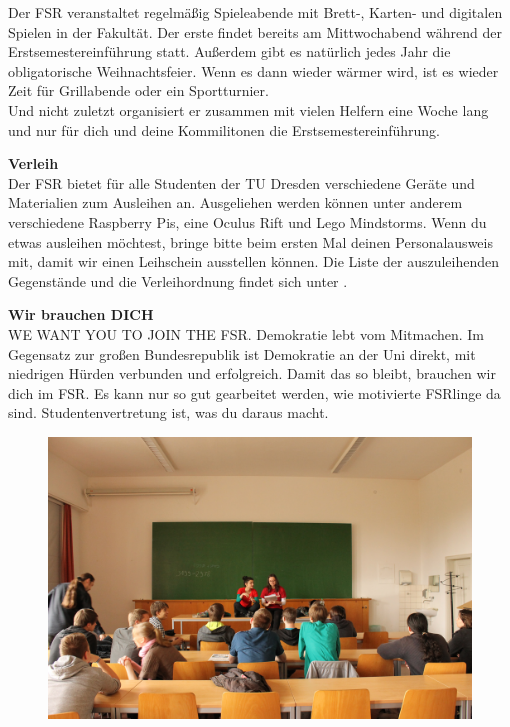 Der FSR veranstaltet regelmäßig Spieleabende mit Brett-, Karten- und digitalen Spielen in der Fakultät. Der erste findet bereits am Mittwochabend während der Erstsemestereinführung statt.
Außerdem gibt es natürlich jedes Jahr die obligatorische Weihnachtsfeier.
Wenn es dann wieder wärmer wird, ist es wieder Zeit für Grillabende oder ein Sportturnier. \\

Und nicht zuletzt organisiert er zusammen mit vielen Helfern eine Woche lang und nur für dich und deine Kommilitonen die Erstsemestereinführung.

\textbf{Verleih} \\
Der FSR bietet für alle Studenten der TU Dresden verschiedene Geräte und Materialien zum Ausleihen an. Ausgeliehen werden können unter anderem verschiedene Raspberry Pis, eine Oculus Rift und Lego Mindstorms.
Wenn du etwas ausleihen möchtest, bringe bitte beim ersten Mal deinen Personalausweis mit, damit wir einen Leihschein ausstellen können.
Die Liste der auszuleihenden Gegenstände und die Verleihordnung findet sich unter .

\textbf{Wir brauchen DICH} \\
WE WANT YOU TO JOIN THE FSR.
Demokratie lebt vom Mitmachen.
Im Gegensatz zur großen Bundesrepublik ist Demokratie an der Uni direkt, mit niedrigen Hürden verbunden und erfolgreich.
Damit das so bleibt, brauchen wir dich im FSR.
Es kann nur so gut gearbeitet werden, wie motivierte FSRlinge da sind.
Studentenvertretung ist, was du daraus macht.

\begin{figure}
\includegraphics[width=\linewidth]{img/ese2013/tutorium.jpg}
\end{figure}


